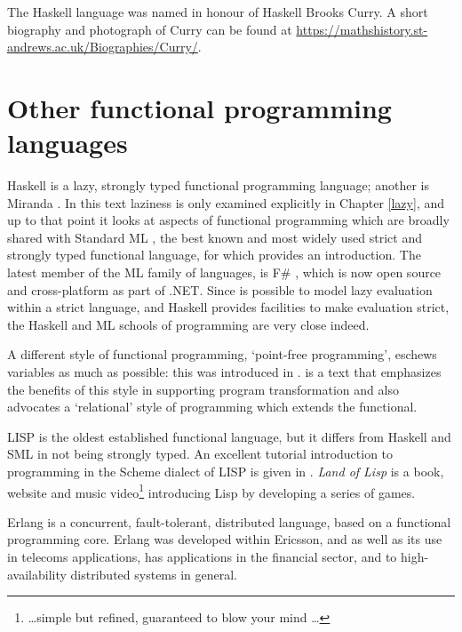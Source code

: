 The Haskell language was named in honour of Haskell Brooks Curry. A
short biography and photograph of Curry can be found at
\url{https://mathshistory.st-andrews.ac.uk/Biographies/Curry/}.

\section*{Other functional programming languages}

Haskell is a lazy, strongly typed functional programming language; 
another is Miranda \cite{mira,miraCraft}. In
this text laziness is only examined explicitly in Chapter \ref{lazy},
and up to that point it looks at aspects of functional programming which
are broadly shared with Standard ML , the
best known and most widely used strict and strongly typed functional language, for which
 provides an introduction. The latest member of the ML family of languages, is F\# \cite{Fsharp}, which is now open source and cross-platform as part of .NET. Since is possible to model
lazy evaluation within a strict language, and Haskell provides
facilities to make evaluation strict, the Haskell and ML schools of programming are very close
indeed.

A different style of functional programming, `point-free programming', eschews variables as much
as possible: this was introduced in .  is a text that
emphasizes the benefits of this style in supporting program
transformation and also advocates a `relational' style of programming
which extends the functional.

LISP is the oldest established functional language, but it differs from
Haskell and SML in not being strongly typed. An excellent tutorial
introduction to programming in the Scheme dialect of LISP is given in 
. \emph{Land of Lisp} \cite{LandOfLisp} is a book, website and music video\footnote{\ldots simple but refined, guaranteed to blow your mind \ldots} introducing Lisp by developing a series of games.
 
Erlang is a concurrent, fault-tolerant, distributed language, based on a functional programming core. Erlang \cite{progErlang,erlangProg} was developed within Ericsson, and as well as its use in telecoms applications, has applications in the financial sector, and to high-availability distributed systems in general. 

